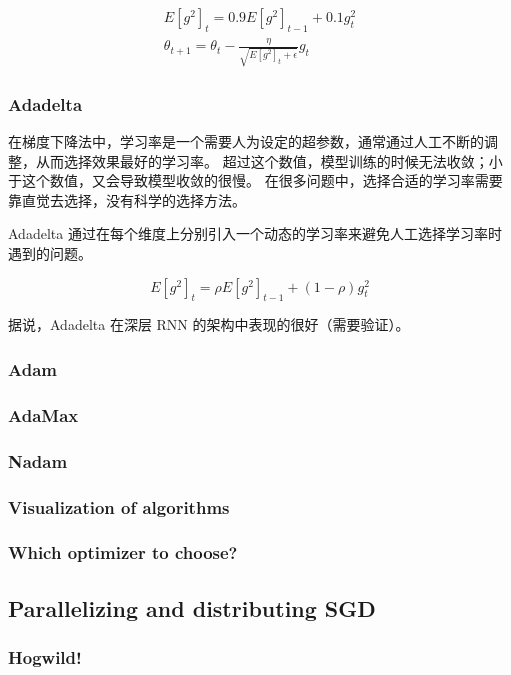 \begin{align*}
    E[g^2]_{t} = 0.9 E[g^2]_{t-1} + 0.1 g_{t}^2 \\
    \theta_{t+1} = \theta_{t} - \frac{\eta}{\sqrt{E[g^2]_{t} + \epsilon}} g_{t}
\end{align*}



\subsubsection{Adadelta}
在梯度下降法中，学习率是一个需要人为设定的超参数，通常通过人工不断的调整，从而选择效果最好的学习率。
超过这个数值，模型训练的时候无法收敛；小于这个数值，又会导致模型收敛的很慢。
在很多问题中，选择合适的学习率需要靠直觉去选择，没有科学的选择方法。

Adadelta\cite{Zeiler:2012aa} 通过在每个维度上分别引入一个动态的学习率来避免人工选择学习率时遇到的问题。

\[
    E[g^2]_t = \rho E[g^2]_{t-1} + (1 - \rho)g_{t}^2
\]

据说，Adadelta 在深层 RNN 的架构中表现的很好（需要验证）。



\subsubsection{Adam}
\subsubsection{AdaMax}
\subsubsection{Nadam}
\subsubsection{Visualization of algorithms}
\subsubsection{Which optimizer to choose?}

\subsection{Parallelizing and distributing SGD}
\subsubsection{Hogwild!}
